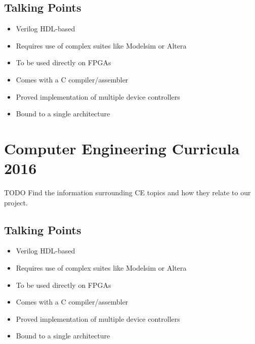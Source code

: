 \subsection{Talking Points}

\begin{itemize}
\item Verilog HDL-based
\item Requires use of complex suites like Modelsim or Altera
\item To be used directly on FPGAs
\item Comes with a C compiler/assembler
\item Proved implementation of multiple device controllers
\item Bound to a single architecture
\end{itemize}

\section{Computer Engineering Curricula 2016 \cite{cec2016}}

TODO Find the information surrounding CE topics and how they relate to our project. 

\subsection{Talking Points}

\begin{itemize}
\item Verilog HDL-based
\item Requires use of complex suites like Modelsim or Altera
\item To be used directly on FPGAs
\item Comes with a C compiler/assembler
\item Proved implementation of multiple device controllers
\item Bound to a single architecture
\end{itemize}


